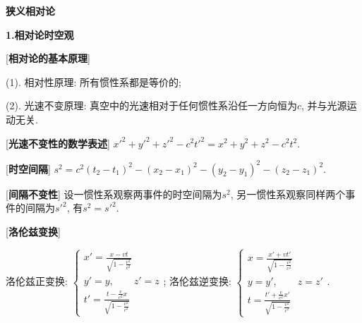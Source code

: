 


 \begin{center} 
 \Large \textbf{狭义相对论}
\end{center}
 
\large 
\begin{center}
 \textbf{1.相对论时空观}
\end{center}

[\textbf{相对论的基本原理}] \par
\qquad (1). 相对性原理: 所有惯性系都是等价的;\par
\qquad (2). 光速不变原理: 真空中的光速相对于任何惯性系沿任一方向恒为$c$, 并与光源运动无关.\par

[\textbf{光速不变性的数学表述}] $x'^2+y'^2+z'^2-c^2t'^2=x^2+y^2+z^2-c^2t^2$.\par

[\textbf{时空间隔}] $s^2=c^2(t_2-t_1)^2-(x_2-x_1)^2-(y_2-y_1)^2-(z_2-z_1)^2$.\par

[\textbf{间隔不变性}] 设一惯性系观察两事件的时空间隔为$s^2$, 另一惯性系观察同样两个事件的间隔为$s'^2$, 有$s^2=s'^2$.\par

[\textbf{洛伦兹变换}]\par
\qquad 洛伦兹正变换: $\begin{cases}x'=\frac{x-vt}{\sqrt{1-\frac{v^2}{c^2}}}\\ y'=y,\qquad z'=z\\ t'=\frac{t-\frac{v}{c^2}x}{\sqrt{1-\frac{v^2}{c^2}}}\end{cases}$;
\qquad 洛伦兹逆变换: $\begin{cases}x=\frac{x'+vt'}{\sqrt{1-\frac{v^2}{c^2}}}\\ y=y',\qquad z=z'\\ t=\frac{t'+\frac{v}{c^2}x'}{\sqrt{1-\frac{v^2}{c^2}}}\end{cases}$.\par

